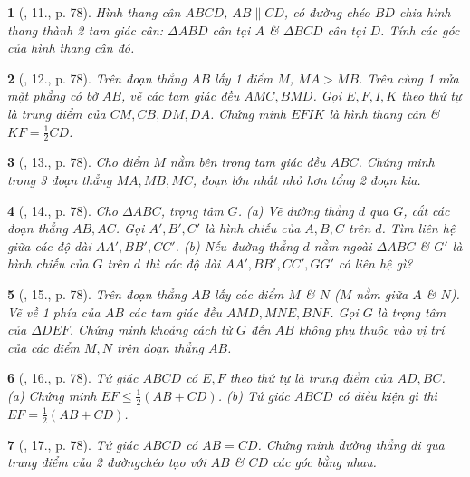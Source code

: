 \documentclass{article}
\newtheorem{baitoan}{}
\begin{document}
\begin{baitoan}[\cite{Binh_Toan_8_tap_1}, 11., p. 78]
	Hình thang cân $ABCD$, $AB\parallel CD$, có đường chéo $BD$ chia hình thang thành 2 tam giác cân: $\Delta ABD$ cân tại $A$ \& $\Delta BCD$ cân tại $D$. Tính các góc của hình thang cân đó.
\end{baitoan}

\begin{baitoan}[\cite{Binh_Toan_8_tap_1}, 12., p. 78]
	Trên đoạn thẳng $AB$ lấy 1 điểm $M$, $MA > MB$. Trên cùng 1 nửa mặt phẳng có bờ $AB$, vẽ các tam giác đều $AMC,BMD$. Gọi $E,F,I,K$ theo thứ tự là trung điểm của $CM,CB,DM,DA$. Chứng minh $EFIK$ là hình thang cân \& $KF = \frac{1}{2}CD$.
\end{baitoan}

\begin{baitoan}[\cite{Binh_Toan_8_tap_1}, 13., p. 78]
	Cho điểm $M$ nằm bên trong tam giác đều $ABC$. Chứng minh trong 3 đoạn thẳng $MA,MB,MC$, đoạn lớn nhất nhỏ hơn tổng 2 đoạn kia.
\end{baitoan}

\begin{baitoan}[\cite{Binh_Toan_8_tap_1}, 14., p. 78]
	Cho $\Delta ABC$, trọng tâm $G$. (a) Vẽ đường thẳng $d$ qua $G$, cắt các đoạn thẳng $AB,AC$. Gọi $A',B',C'$ là hình chiếu của $A,B,C$ trên $d$. Tìm liên hệ giữa các độ dài $AA',BB',CC'$. (b) Nếu đường thẳng $d$ nằm ngoài $\Delta ABC$ \& $G'$ là hình chiếu của $G$ trên $d$ thì các độ dài $AA',BB',CC',GG'$ có liên hệ gì?
\end{baitoan}

\begin{baitoan}[\cite{Binh_Toan_8_tap_1}, 15., p. 78]
	Trên đoạn thẳng $AB$ lấy các điểm $M$ \& $N$ ($M$ nằm giữa $A$ \& $N$). Vẽ về 1 phía của $AB$ các tam giác đều $AMD,MNE,BNF$. Gọi $G$ là trọng tâm của $\Delta DEF$. Chứng minh khoảng cách từ $G$ đến $AB$ không phụ thuộc vào vị trí của các điểm $M,N$ trên đoạn thẳng $AB$.
\end{baitoan}

\begin{baitoan}[\cite{Binh_Toan_8_tap_1}, 16., p. 78]
	Tứ giác $ABCD$ có $E,F$ theo thứ tự là trung điểm của $AD,BC$. (a) Chứng minh $EF\le\frac{1}{2}(AB + CD)$. (b) Tứ giác $ABCD$ có điều kiện gì thì $EF = \frac{1}{2}(AB + CD)$.
\end{baitoan}

\begin{baitoan}[\cite{Binh_Toan_8_tap_1}, 17., p. 78]
	Tứ giác $ABCD$ có $AB = CD$. Chứng minh đường thẳng đi qua trung điểm của 2 đườngchéo tạo với $AB$ \& $CD$ các góc bằng nhau.
\end{baitoan}
\end{document}
